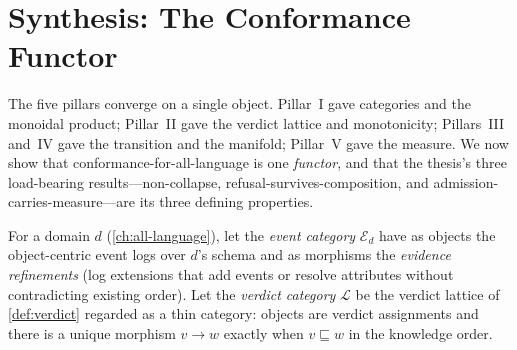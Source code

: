 \section{Synthesis: The Conformance Functor}
\label{sec:synthesis-functor}

The five pillars converge on a single object. Pillar~I gave categories and the
monoidal product; Pillar~II gave the verdict lattice and monotonicity; Pillars~III
and~IV gave the transition and the manifold; Pillar~V gave the measure. We now show
that conformance-for-all-language is one \emph{functor}, and that the thesis's three
load-bearing results---non-collapse, refusal-survives-composition, and
admission-carries-measure---are its three defining properties.

\begin{definition}
\label{def:event-cat}
For a domain $d$ (\cref{ch:all-language}), let the \emph{event category}
$\mathcal E_d$ have as objects the object-centric event logs over $d$'s schema and as
morphisms the \emph{evidence refinements} (log extensions that add events or resolve
attributes without contradicting existing order). Let the \emph{verdict category}
$\mathcal L$ be the verdict lattice of \cref{def:verdict} regarded as a thin
category: objects are verdict assignments and there is a unique morphism
$v\to w$ exactly when $v\sqsubseteq w$ in the knowledge order.
\end{definition}

